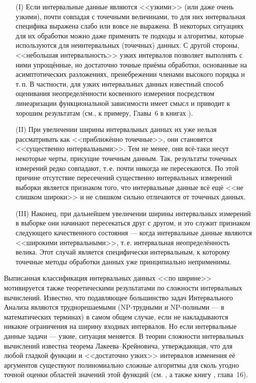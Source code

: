 \documentclass[a5paper,openany]{book}
\begin{document}
\begin{itemize} 
\item[(I)] 
Если интервальные данные являются <<узкими>> (или даже очень узкими), почти совпадая 
с точечными величинами, то для них интервальная специфика выражена слабо или вовсе 
не выражена. В некоторых ситуациях для их обработки можно даже применять те подходы 
и алгоритмы, которые используются для неинтервальных (точечных) данных. С другой стороны, 
<<небольшая интервальность>> узких интервалов позволяет выполнять с ними упрощённые, но 
достаточно точные приёмы обработки, основанные на асимптотических разложениях, пренебрежении 
членами высокого порядка и т.\,п. В частности, для узких интервальных данных известный 
способ оценивания неопределённости косвенного измерения посредством линеаризации 
функциональной зависимости имеет смысл и приводит к хорошим результатам (см., 
к примеру, Главы~6 в книгах \cite{Rabinovich1978,Rabinovich2005}). 
\item[(II)] 
При увеличении ширины интервальных данных  их уже нельзя рассматривать как 
<<приближённо точечные>>, они становятся <<существенно интервальными>>. Тем не менее,  
они всё-таки несут некоторые черты, присущие точечным данным. Так, результаты точечных
измерений редко совпадают, т.\,е. почти никогда не пересекаются. По этой причине 
отсутствие пересечений существенно интервальных измерений выборки является признаком 
того, что интервальные данные всё ещё <<не слишком широки>> и не слишком сильно 
отличаются от точечных данных. 
\item[(III)]   
Наконец, при дальнейшем увеличении ширины интервальных измерений в выборке они начинают 
пересекаться друг с другом, и это служит признаком следующего качественного состояния 
--- когда интервальные данные являются <<широкими интервальными>>, т.\,е. интервальная 
неопределённость велика. Этот случай является специфически интервальным, к которому 
точечные методы обработки данных уже принципиально неприменимы. 
\end{itemize}  
  
Выписанная классификация интервальных данных <<по ширине>> мотивируется также 
теоретическими результатами по сложности интервальных вычислений. Известно, что 
подавляющее большинство задач Интервального Анализа являются труднорешаемыми 
(NP-трудными и NP-полными --- в математических терминах) в самом общем случае, если 
не накладываются никакие ограничения на ширину входных интервалов. Но если интервальные 
данные задачи --- узкие, ситуация меняется. В теории сложности интервальных вычислений 
известна теорема Лакеева--Крейновича, утверждающая, что для любой гладкой функции и 
<<достаточно узких>> интервалов изменения её аргументов существуют полиномиально 
сложные алгоритмы для сколь угодно точной оценки областей значений этой функций 
(см. \cite{LakeKreino}, а также книгу \cite{KreLakRohnKahl}, 
глава~16).  
\end{document}

